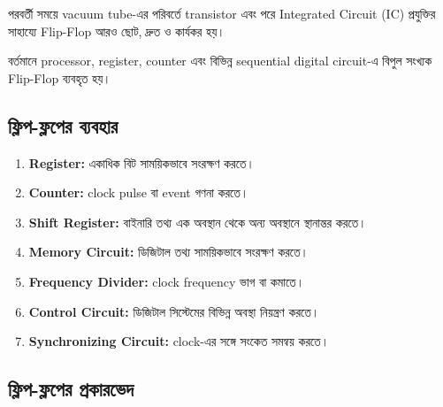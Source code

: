 পরবর্তী সময়ে \textenglish{vacuum tube}-এর পরিবর্তে
\textenglish{transistor} এবং পরে
\textenglish{Integrated Circuit (IC)} প্রযুক্তির সাহায্যে
\textenglish{Flip-Flop} আরও ছোট, দ্রুত ও কার্যকর হয়।

বর্তমানে \textenglish{processor}, \textenglish{register},
\textenglish{counter} এবং বিভিন্ন
\textenglish{sequential digital circuit}-এ
বিপুল সংখ্যক \textenglish{Flip-Flop} ব্যবহৃত হয়।



\subsection{ফ্লিপ-ফ্লপের ব্যবহার}

\begin{enumerate}[leftmargin=*,itemsep=2pt]

    \item \textbf{\textenglish{Register}:}
    একাধিক বিট সাময়িকভাবে সংরক্ষণ করতে।

    \item \textbf{\textenglish{Counter}:}
    \textenglish{clock pulse} বা
    \textenglish{event} গণনা করতে।

    \item \textbf{\textenglish{Shift Register}:}
    বাইনারি তথ্য এক অবস্থান থেকে অন্য অবস্থানে স্থানান্তর করতে।

    \item \textbf{\textenglish{Memory Circuit}:}
    ডিজিটাল তথ্য সাময়িকভাবে সংরক্ষণ করতে।

    \item \textbf{\textenglish{Frequency Divider}:}
    \textenglish{clock frequency} ভাগ বা কমাতে।

    \item \textbf{\textenglish{Control Circuit}:}
    ডিজিটাল সিস্টেমের বিভিন্ন অবস্থা নিয়ন্ত্রণ করতে।

    \item \textbf{\textenglish{Synchronizing Circuit}:}
    \textenglish{clock}-এর সঙ্গে সংকেত সমন্বয় করতে।

\end{enumerate}



\subsection{ফ্লিপ-ফ্লপের প্রকারভেদ}

